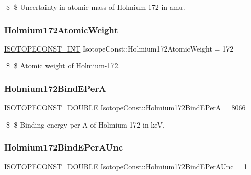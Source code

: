 \$ \$ Uncertainty in atomic mass of Holmium-\/172 in amu. \mbox{\label{group___isotope_const-_holmium-_ho172_ga76a1a30e5f1c8b79084e1d31194c171d}} 
\subsubsection{\texorpdfstring{Holmium172\+Atomic\+Weight}{Holmium172AtomicWeight}}
{\footnotesize\ttfamily \mbox{\hyperlink{group___isotope_const-_macros_ga5f18360b3e99483a35c32d789e62621c}{I\+S\+O\+T\+O\+P\+E\+C\+O\+N\+S\+T\+\_\+\+I\+NT}} Isotope\+Const\+::\+Holmium172\+Atomic\+Weight = 172}

\$ \$ Atomic weight of Holmium-\/172. \mbox{\label{group___isotope_const-_holmium-_ho172_ga3d52816a529a9540a588e4c178e08dd8}} 
\subsubsection{\texorpdfstring{Holmium172\+Bind\+E\+PerA}{Holmium172BindEPerA}}
{\footnotesize\ttfamily \mbox{\hyperlink{group___isotope_const-_macros_ga8f45a7272ce02c0b4c65c44636ed719a}{I\+S\+O\+T\+O\+P\+E\+C\+O\+N\+S\+T\+\_\+\+D\+O\+U\+B\+LE}} Isotope\+Const\+::\+Holmium172\+Bind\+E\+PerA = 8066}

\$ \$ Binding energy per A of Holmium-\/172 in keV. \mbox{\label{group___isotope_const-_holmium-_ho172_gaa8a0a9064d5e255fe0a8fdbe4b6cc706}} 
\subsubsection{\texorpdfstring{Holmium172\+Bind\+E\+Per\+A\+Unc}{Holmium172BindEPerAUnc}}
{\footnotesize\ttfamily \mbox{\hyperlink{group___isotope_const-_macros_ga8f45a7272ce02c0b4c65c44636ed719a}{I\+S\+O\+T\+O\+P\+E\+C\+O\+N\+S\+T\+\_\+\+D\+O\+U\+B\+LE}} Isotope\+Const\+::\+Holmium172\+Bind\+E\+Per\+A\+Unc = 1}

